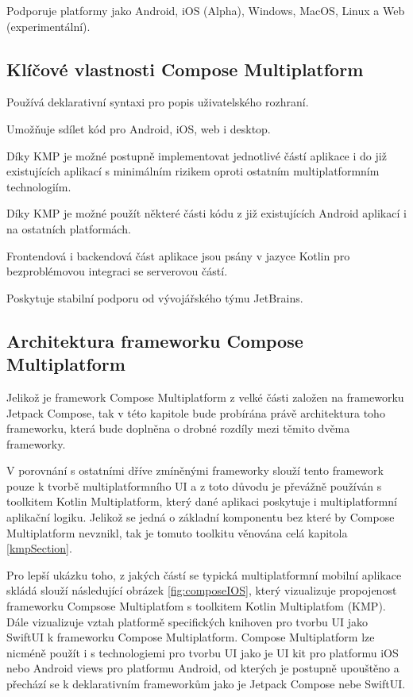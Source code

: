 Podporuje platformy jako Android, iOS (Alpha), Windows, MacOS, Linux a Web (experimentální). \cite{composeMultiplatform}

\medskip

\subsection*{Klíčové vlastnosti Compose Multiplatform}

Používá deklarativní syntaxi pro popis uživatelského rozhraní. \cite{KMPUseCases}

Umožňuje sdílet kód pro Android, iOS, web i desktop. \cite{composeMultiplatform}

Díky KMP je možné postupně implementovat jednotlivé částí aplikace i do již existujících aplikací s minimálním rizikem oproti
ostatním multiplatformním technologiím. \cite{KMP}

Díky KMP je možné použít některé části kódu z již existujících Android aplikací i na ostatních platformách.

Frontendová i backendová část aplikace jsou psány v jazyce Kotlin pro bezproblémovou integraci se serverovou částí.

Poskytuje stabilní podporu od vývojářského týmu JetBrains.

\subsection*{Architektura frameworku Compose Multiplatform} \label{ComposeArch}
Jelikož je framework Compose Multiplatform z velké části založen na frameworku Jetpack Compose, tak v této kapitole bude probírána
právě architektura toho frameworku, která bude doplněna o drobné rozdíly mezi těmito dvěma frameworky.

V porovnání s ostatními dříve zmíněnými frameworky slouží tento framework pouze k tvorbě multiplatformního UI a z toto důvodu je převážně 
používán s toolkitem Kotlin Multiplatform, který dané aplikaci poskytuje i multiplatformní aplikační logiku. Jelikož se jedná o základní 
komponentu bez které by Compose Multiplatform nevznikl, tak je tomuto toolkitu věnována celá kapitola \ref{kmpSection}.

Pro lepší ukázku toho, z jakých částí se typická multiplatformní mobilní aplikace skládá slouží následující obrázek \ref{fig:composeIOS}, který
vizualizuje propojenost frameworku Compsose Multiplatfom s toolkitem Kotlin Multiplatfom (KMP). Dále vizualizuje 
vztah platformě specifických knihoven pro tvorbu UI jako SwiftUI k frameworku Compose Multiplatform.
Compose Multiplatform lze nicméně použít i s technologiemi pro tvorbu UI jako je UI kit pro platformu iOS nebo
Android views  pro platformu Android, od kterých je postupně upouštěno a přechází se k deklarativním frameworkům jako je Jetpack Compose nebe SwiftUI.  

